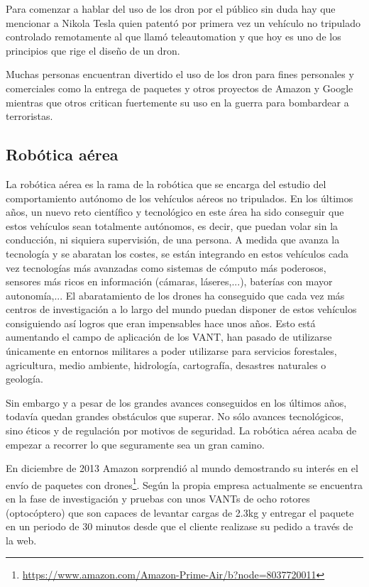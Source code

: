 Para comenzar a hablar del uso de los dron por el público sin duda hay que mencionar a Nikola Tesla quien patentó por primera vez un vehículo no tripulado controlado remotamente al que llamó teleautomation y que hoy es uno de los principios que rige el diseño de un dron.    

Muchas personas encuentran divertido el uso de los dron para fines personales y comerciales como la entrega de paquetes y otros proyectos de Amazon y Google mientras que otros critican fuertemente su uso en la guerra para bombardear a terroristas.

\subsection{Robótica aérea}

La robótica aérea es la rama de la robótica que se encarga del estudio del comportamiento autónomo de los vehículos aéreos no tripulados. En los últimos años, un nuevo reto científico y tecnológico en este área ha sido conseguir que estos vehículos sean totalmente autónomos, es decir, que puedan volar sin la conducción, ni siquiera supervisión, de una persona. A medida que avanza la tecnología y se abaratan los costes, se están integrando en estos vehículos cada vez tecnologías más avanzadas como sistemas de cómputo más poderosos, sensores más ricos en información (cámaras, láseres,...), baterías con mayor autonomía,... El abaratamiento de los drones ha conseguido que cada vez más centros de investigación a lo largo del mundo puedan disponer de estos vehículos consiguiendo así logros que eran impensables hace unos años. Esto está aumentando el campo de aplicación de los VANT, han pasado de utilizarse únicamente en entornos militares a poder utilizarse para servicios forestales, agricultura, medio ambiente, hidrología, cartografía, desastres naturales o geología. 

Sin embargo y a pesar de los grandes avances conseguidos en los últimos años, todavía quedan grandes obstáculos que superar. No sólo avances tecnológicos, sino éticos y de regulación por motivos de seguridad. La robótica aérea acaba de empezar a recorrer lo que seguramente sea un gran camino. 

En diciembre de 2013 Amazon sorprendió al mundo demostrando su interés en el envío de paquetes con drones\footnote{\url{https://www.amazon.com/Amazon-Prime-Air/b?node=8037720011}}. Según la propia empresa actualmente se encuentra en la fase de investigación y pruebas con unos VANTs de ocho rotores (optocóptero) que son capaces de levantar cargas de 2.3kg y entregar el paquete en un periodo de 30 minutos desde que el cliente realizase su pedido a través de la web. 

